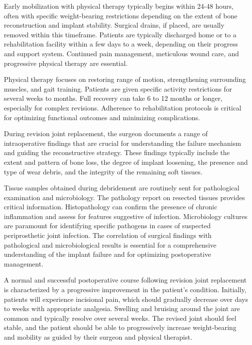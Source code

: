 Early mobilization with physical therapy typically begins within 24-48 hours, often with specific weight-bearing restrictions depending on the extent of bone reconstruction and implant stability. Surgical drains, if placed, are usually removed within this timeframe. Patients are typically discharged home or to a rehabilitation facility within a few days to a week, depending on their progress and support system. Continued pain management, meticulous wound care, and progressive physical therapy are essential. 

Physical therapy focuses on restoring range of motion, strengthening surrounding muscles, and gait training. Patients are given specific activity restrictions for several weeks to months. Full recovery can take 6 to 12 months or longer, especially for complex revisions. Adherence to rehabilitation protocols is critical for optimizing functional outcomes and minimizing complications.

During revision joint replacement, the surgeon documents a range of intraoperative findings that are crucial for understanding the failure mechanism and guiding the reconstructive strategy. These findings typically include the extent and pattern of bone loss, the degree of implant loosening, the presence and type of wear debris, and the integrity of the remaining soft tissues. 

Tissue samples obtained during debridement are routinely sent for pathological examination and microbiology. The pathology report on resected tissues provides critical information. Histopathology can confirm the presence of chronic inflammation and assess for features suggestive of infection. Microbiology cultures are paramount for identifying specific pathogens in cases of suspected periprosthetic joint infection. The correlation of surgical findings with pathological and microbiological results is essential for a comprehensive understanding of the implant failure and for optimizing postoperative management.

A normal and successful postoperative course following revision joint replacement is characterized by a progressive improvement in the patient's condition. Initially, patients will experience incisional pain, which should gradually decrease over days to weeks with appropriate analgesia. Swelling and bruising around the joint are common and typically resolve over several weeks. The revised joint should feel stable, and the patient should be able to progressively increase weight-bearing and mobility as guided by their surgeon and physical therapist.

